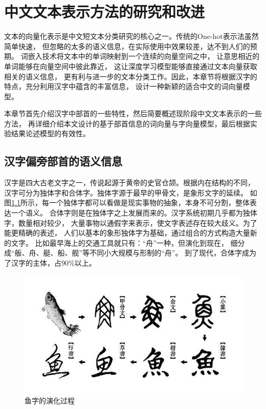 \chapter{中文文本表示方法的研究和改进}
文本的向量化表示是中文短文本分类研究的核心之一。传统的One-hot表示法虽然简单快速，
但忽略的太多的语义信息，在实际使用中效果较差，达不到人们的预期。
词嵌入技术将文本中的单词映射到一个连续的向量空间之中，
让意思相近的单词能够在向量空间中彼此靠近，
这让深度学习模型能够直接通过文本向量获取相关的语义信息，
更有利与进一步的文本分类工作。因此，本章节将根据汉字的特点，充分利用汉字中蕴含的丰富信息，
设计一种新颖的适合中文的词向量模型。

本章节首先介绍汉字中部首的一些特性，然后简要概述现阶段中文文本表示的一些方法，
再详细介绍本文设计的基于部首信息的词向量与字向量模型，最后根据实验结果论述模型的有效性。
\section{汉字偏旁部首的语义信息}
\label{radical_information}
汉字是四大古老文字之一，传说起源于黄帝的史官仓颉。根据内在结构的不同，
汉字可分为独体字和合体字。独体字源于最早的甲骨文，是象形文字的延续。
如图\ref{char_fish}所示，每一个独体字都可以看做是现实事物的抽象，本身不可分割，整体表达一个语义。
合体字则是在独体字之上发展而来的。汉字系统初期几乎都为独体字，数量相对较少，
大量事物以通假字来表示，使文字表述存在较大歧义。为了能更精确的表述，
人们以基本的象形独体字为基础，通过组合的方式构造大量新的文字。
比如最早海上的交通工具就只有：“舟”一种，但演化到现在，
细分成“舨、舟、艇、船、舰”等不同小大规模与形制的“舟”。
到了现代，合体字成为了汉字的主体，占90\%以上。
\begin{figure}[h]
    \includegraphics[scale=0.6]{picture/char.png}
    \caption{鱼字的演化过程}
    \label{char_fish}
\end{figure}

